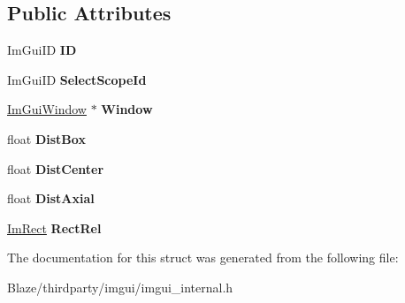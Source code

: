 \subsection*{Public Attributes}
\begin{DoxyCompactItemize}
\item 
\mbox{\label{structImGuiNavMoveResult_a1f74aade31c404a897cf20f538861fb0}} 
Im\+Gui\+ID {\bfseries ID}
\item 
\mbox{\label{structImGuiNavMoveResult_a0e07116956d6c7e7b057c4378ce538de}} 
Im\+Gui\+ID {\bfseries Select\+Scope\+Id}
\item 
\mbox{\label{structImGuiNavMoveResult_a23b95c81d85a99990560c4072a135eb6}} 
\hyperlink{structImGuiWindow}{Im\+Gui\+Window} $\ast$ {\bfseries Window}
\item 
\mbox{\label{structImGuiNavMoveResult_a2f354f281a4bd3dcb67f62ca945a11a3}} 
float {\bfseries Dist\+Box}
\item 
\mbox{\label{structImGuiNavMoveResult_abba7cd20008c9a6ad40a2c058d4fdb92}} 
float {\bfseries Dist\+Center}
\item 
\mbox{\label{structImGuiNavMoveResult_ae5c10e5023d0a29fb7d5cbfa67cf20e5}} 
float {\bfseries Dist\+Axial}
\item 
\mbox{\label{structImGuiNavMoveResult_ae1be85fdcad1fc7c2bfa367862da2ccf}} 
\hyperlink{structImRect}{Im\+Rect} {\bfseries Rect\+Rel}
\end{DoxyCompactItemize}


The documentation for this struct was generated from the following file\+:\begin{DoxyCompactItemize}
\item 
Blaze/thirdparty/imgui/imgui\+\_\+internal.\+h\end{DoxyCompactItemize}
